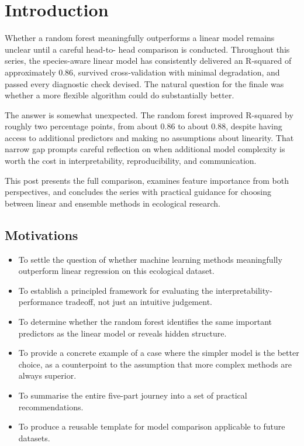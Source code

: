 \documentclass[
  letterpaper,
  DIV=11,
  numbers=noendperiod]{scrartcl}
\providecommand{\tightlist}{%
  \setlength{\itemsep}{0pt}\setlength{\parskip}{0pt}}
\begin{document}
\section{Introduction}\label{introduction}

Whether a random forest meaningfully outperforms a linear model remains
unclear until a careful head-to- head comparison is conducted.
Throughout this series, the species-aware linear model has consistently
delivered an R-squared of approximately 0.86, survived cross-validation
with minimal degradation, and passed every diagnostic check devised. The
natural question for the finale was whether a more flexible algorithm
could do substantially better.

The answer is somewhat unexpected. The random forest improved R-squared
by roughly two percentage points, from about 0.86 to about 0.88, despite
having access to additional predictors and making no assumptions about
linearity. That narrow gap prompts careful reflection on when additional
model complexity is worth the cost in interpretability, reproducibility,
and communication.

This post presents the full comparison, examines feature importance from
both perspectives, and concludes the series with practical guidance for
choosing between linear and ensemble methods in ecological research.

\subsection{Motivations}\label{motivations}

\begin{itemize}
\tightlist
\item
  To settle the question of whether machine learning methods
  meaningfully outperform linear regression on this ecological dataset.
\item
  To establish a principled framework for evaluating the
  interpretability-performance tradeoff, not just an intuitive
  judgement.
\item
  To determine whether the random forest identifies the same important
  predictors as the linear model or reveals hidden structure.
\item
  To provide a concrete example of a case where the simpler model is the
  better choice, as a counterpoint to the assumption that more complex
  methods are always superior.
\item
  To summarise the entire five-part journey into a set of practical
  recommendations.
\item
  To produce a reusable template for model comparison applicable to
  future datasets.
\end{itemize}
\end{document}
